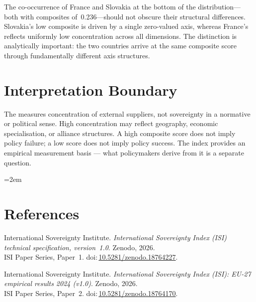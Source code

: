\documentclass[12pt,a4paper]{article}
\begin{document}
The co-occurrence of France and Slovakia at the bottom of the distribution---both with composites of~0.236---should not obscure their structural differences.  Slovakia's low composite is driven by a single zero-valued axis, whereas France's reflects uniformly low concentration across all dimensions.  The distinction is analytically important: the two countries arrive at the same composite score through fundamentally different axis structures.


\section{Interpretation Boundary}
\label{sec:interpretation}

The \ISI measures concentration of external suppliers, not sovereignty in a normative or political sense.  High concentration may reflect geography, economic specialisation, or alliance structures.  A high composite score does not imply policy failure; a low score does not imply policy success.  The index provides an empirical measurement basis --- what policymakers derive from it is a separate question.


\clearpage
\vspace*{1.5cm}

\begingroup\emergencystretch=2em
\section*{References}

\begin{enumerate}[label={[\arabic*]},leftmargin=2em,itemsep=6pt]
\item International Sovereignty Institute.
  \textit{International Sovereignty Index (ISI) technical specification, version~1.0}.
  Zenodo, 2026.\\ISI Paper Series, Paper~1.
  doi:\,\href{https://doi.org/10.5281/zenodo.18764227}{10.5281/zenodo.18764227}.

\item International Sovereignty Institute.
  \textit{International Sovereignty Index (ISI): EU-27 empirical results 2024 (v1.0)}.
  Zenodo, 2026.\\ISI Paper Series, Paper~2.
  doi:\,\href{https://doi.org/10.5281/zenodo.18764170}{10.5281/zenodo.18764170}.
\end{enumerate}
\endgroup
\end{document}
